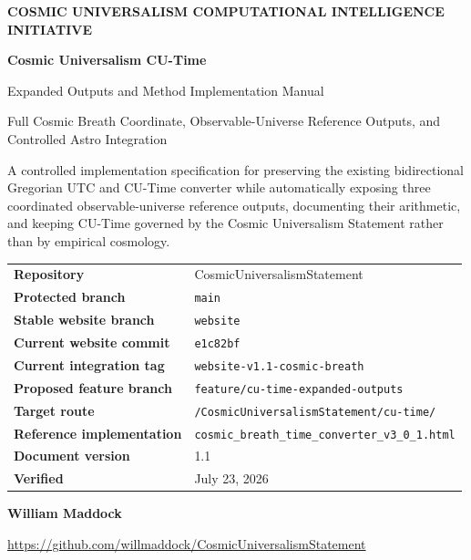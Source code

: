 \documentclass[11pt,letterpaper]{article}
\newcommand{\ProjectTitle}{Cosmic Universalism CU-Time}
\newcommand{\DocumentTitle}{Expanded Outputs and Method Implementation Manual}
\newcommand{\DocumentSubtitle}{Full Cosmic Breath Coordinate, Observable-Universe Reference Outputs, and Controlled Astro Integration}
\newcommand{\RepositoryName}{CosmicUniversalismStatement}
\newcommand{\RepositoryURL}{https://github.com/willmaddock/CosmicUniversalismStatement}
\newcommand{\ProtectedBranch}{main}
\newcommand{\StableBranch}{website}
\newcommand{\ProposedBranch}{feature/cu-time-expanded-outputs}
\newcommand{\TargetRoute}{/CosmicUniversalismStatement/cu-time/}
\newcommand{\CurrentWebsiteCommit}{e1c82bf}
\newcommand{\CurrentIntegrationTag}{website-v1.1-cosmic-breath}
\newcommand{\DocumentVersion}{1.1}
\newcommand{\VerificationDate}{July 23, 2026}
\newcommand{\AuthorName}{William Maddock}
\begin{document}
\hypersetup{pageanchor=false}

\begin{titlepage}
\pagecolor{CUNavy}
\color{white}
\thispagestyle{empty}

\vspace*{0.5in}

{\small\bfseries\color{CUCyanLight}
COSMIC UNIVERSALISM COMPUTATIONAL INTELLIGENCE INITIATIVE}

\vspace{0.34in}

{\Huge\bfseries
\ProjectTitle}

\vspace{0.14in}

{\LARGE\color{CUGoldLight}
\DocumentTitle}

\vspace{0.12in}

{\large\color{CUBlueLight}
\DocumentSubtitle}

\vspace{0.32in}

{\large
A controlled implementation specification for preserving the existing
bidirectional Gregorian UTC and CU-Time converter while automatically exposing
three coordinated observable-universe reference outputs, documenting their
arithmetic, and keeping CU-Time governed by the Cosmic Universalism Statement
rather than by empirical cosmology.}

\vfill

\begin{tcolorbox}[
    colback=CUNavyTwo, colframe=CUBlue, boxrule=0.8pt, arc=2mm,
    width=\textwidth
]
\color{white}
\begin{tabularx}{\textwidth}{>{\bfseries}L{1.85in}Y}
Repository & \RepositoryName \\
Protected branch & \texttt{\ProtectedBranch} \\
Stable website branch & \texttt{\StableBranch} \\
Current website commit & \texttt{\CurrentWebsiteCommit} \\
Current integration tag & \texttt{\CurrentIntegrationTag} \\
Proposed feature branch & \texttt{\ProposedBranch} \\
Target route & \texttt{\TargetRoute} \\
Reference implementation & \texttt{cosmic\_breath\_time\_converter\_v3\_0\_1.html} \\
Document version & \DocumentVersion \\
Verified & \VerificationDate \\
\end{tabularx}
\end{tcolorbox}

\vspace{0.28in}

{\large\bfseries \AuthorName}

\vspace{0.08in}

{\small\url{\RepositoryURL}}

\end{titlepage}
\end{document}
